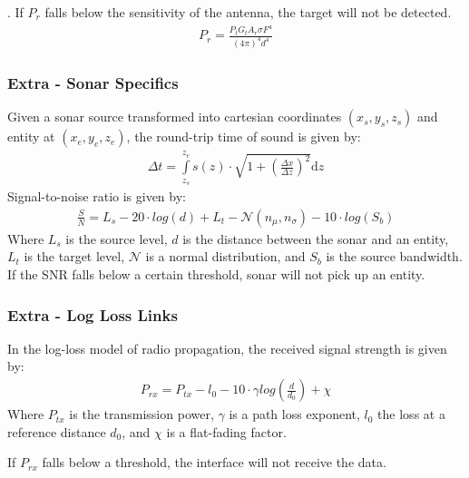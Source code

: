 \documentclass[mathserif,usenames,dvipsnames]{beamer}
\newcommand{\backupend}{
       \addtocounter{framenumberappendix}{-\value{framenumber}}
          \addtocounter{framenumber}{\value{framenumberappendix}} 
}
\begin{document}
{. If $P_r$ falls below the sensitivity of the antenna, the target will not be detected.
    {\footnotesize
    \begin{align*}
        P_r = \frac{P_t G_t A_r \sigma F^4}{\left(4 \pi\right)^4 d^4}
    \end{align*}
    }
}

\frame
{
    \frametitle{Extra - Sonar Specifics}
    \small
    Given a sonar source transformed into cartesian coordinates $(x_s, y_s, z_s)$ and entity at $(x_e, y_e, z_e)$, the round-trip time of sound is given by:
    \begin{align*}
        \Delta t = \int\limits_{z_s}^{z_e}{s(z) \cdot \sqrt{1 + \left(\frac{\Delta x}{\Delta z}\right)^2} \mathrm{d}z}
    \end{align*}
    Signal-to-noise ratio is given by:
    \begin{align*}
        \frac{S}{N} = L_s - 20 \cdot log(d) + L_t - \mathcal{N}(n_\mu, n_\sigma) - 10 \cdot log(S_b)
    \end{align*}
    Where $L_s$ is the source level, $d$ is the distance between the sonar and an entity, $L_t$ is the target level, $\mathcal{N}$ is a normal distribution, and $S_b$ is the source bandwidth.  If the SNR falls below a certain threshold, sonar will not pick up an entity.
}

\frame
{
    \frametitle{Extra - Log Loss Links}
    In the log-loss model of radio propagation, the received signal strength is given by:
    \begin{align*}
        P_{rx} = P_{tx} - l_0 - 10 \cdot \gamma log(\frac{d}{d_0}) + \chi
    \end{align*}
    Where $P_{tx}$ is the transmission power, $\gamma$ is a path loss exponent, $l_0$ the loss at a reference distance $d_0$, and $\chi$ is a flat-fading factor.

    If $P_{rx}$ falls below a threshold, the interface will not receive the data.
}

\backupend
\end{document}
